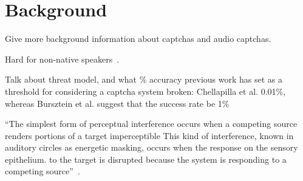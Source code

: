 \section{Background}
\label{sec:background}

Give more background information about captchas and audio captchas.

Hard for non-native speakers~\cite{yan2008usability}.

Talk about threat model, and what \% accuracy previous work has
set as a threshold for considering a captcha system broken:
Chellapilla et al. \cite{chellapilla2005designing} 0.01\%,
whereas Bursztein et al. \cite{bursztein2011failure} suggest that
the success rate be 1\%

``The simplest form of perceptual interference occurs when a competing source renders portions of a target imperceptible
This kind of interference, known in auditory circles as energetic masking, occurs when the response on the sensory epithelium.
to the target is disrupted because the system is responding to a competing source''~\cite{shinn2008object}.
